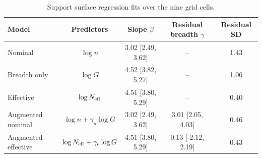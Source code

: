 \begin{table}[htbp]
\centering
\small
\begin{tabular}{lcccc}
\toprule
Model & Predictors & Slope $\beta$ & Residual breadth $\gamma$ & Residual SD \\
\midrule
Nominal & $\log n$ & 3.02 [2.49, 3.62] & -- & 1.43 \\
Breadth only & $\log G$ & 4.52 [3.82, 5.27] & -- & 1.06 \\
Effective & $\log N_{\mathrm{eff}}$ & 4.51 [3.80, 5.29] & -- & 0.40 \\
\midrule
Augmented nominal & $\log n + \gamma_n \log G$ & 3.02 [2.49, 3.62] & 3.01 [2.05, 4.03] & 0.46 \\
Augmented effective & $\log N_{\mathrm{eff}} + \gamma_e \log G$ & 4.51 [3.80, 5.29] & 0.13 [-2.12, 2.19] & 0.43 \\
\bottomrule
\end{tabular}
\caption{Support surface regression fits over the nine grid cells.}
\label{tab:breadth_surface_fits}
\end{table}
